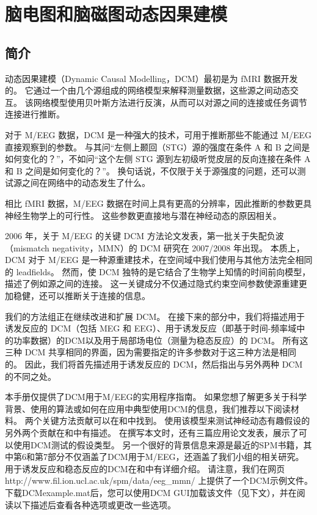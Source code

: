 \chapter{脑电图和脑磁图动态因果建模}
\label{ch:16}


\section{简介}

动态因果建模（Dynamic Causal  Modelling，DCM）最初是为 fMRI 数据开发的。
它通过一个由几个源组成的网络模型来解释测量数据，这些源之间动态交互。
该网络模型使用贝叶斯方法进行反演，从而可以对源之间的连接或任务调节连接进行推断。

对于 M/EEG 数据，DCM 是一种强大的技术，可用于推断那些不能通过 M/EEG 直接观察到的参数。
与其问“左侧上颞回（STG）源的强度在条件 A 和 B 之间是如何变化的？”，不如问“这个左侧 STG 源到左初级听觉皮层的反向连接在条件 A 和 B 之间是如何变化的？”。
换句话说，不仅限于关于源强度的问题，还可以测试源之间在网络中的动态发生了什么。

相比 fMRI 数据，M/EEG 数据在时间上具有更高的分辨率，因此推断的参数更具神经生物学上的可行性。
这些参数更直接地与潜在神经动态的原因相关。

2006 年，关于 M/EEG 的关键 DCM 方法论文发表，第一批关于失配负波（mismatch negativity，MMN）的 DCM 研究在 2007/2008 年出现。
本质上，DCM 对于 M/EEG 是一种源重建技术，在空间域中我们使用与其他方法完全相同的 leadfields。
然而，使 DCM 独特的是它结合了生物学上知情的时间前向模型，描述了例如源之间的连接。
这一关键成分不仅通过隐式约束空间参数使源重建更加稳健，还可以推断关于连接的信息。

我们的方法组正在继续改进和扩展 DCM。
在接下来的部分中，我们将描述用于诱发反应的 DCM（包括 MEG 和 EEG）、用于诱发反应（即基于时间-频率域中的功率数据）的DCM以及用于局部场电位（测量为稳态反应）的 DCM。
所有这三种 DCM 共享相同的界面，因为需要指定的许多参数对于这三种方法是相同的。
因此，我们将首先描述用于诱发反应的 DCM，然后指出与另外两种 DCM 的不同之处。

本手册仅提供了DCM用于M/EEG的实用程序指南。
如果您想了解更多关于科学背景、使用的算法或如何在应用中典型使用DCM的信息，我们推荐以下阅读材料。
两个关键方法贡献可以在\cite{u29}和\cite{u76}中找到。
使用该模型来测试神经动态有趣假设的另外两个贡献在\cite{u77}和\cite{u33}中有描述。
在撰写本文时，还有三篇应用论文发表，展示了可以使用DCM测试的假设类型\cite{u56,u55,u54}。
另一个很好的背景信息来源是最近的SPM书籍\cite{u36}，其中第6和第7部分不仅涵盖了DCM用于M/EEG，还涵盖了我们小组的相关研究。
用于诱发反应和稳态反应的DCM在\cite{u23,u22}和\cite{u91,u87,u88}中有详细介绍。
请注意，我们在网页http://www.fil.ion.ucl.ac.uk/spm/data/eeg\_mmn/ 上提供了一个DCM示例文件。
下载DCMexample.mat后，您可以使用DCM GUI加载该文件（见下文），并在阅读以下描述后查看各种选项或更改一些选项。


